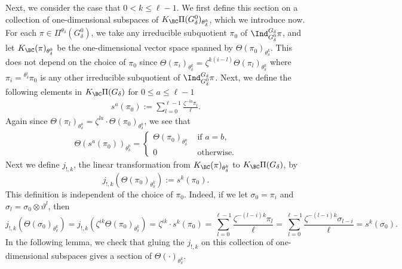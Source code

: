 \documentclass[11pt,letterpaper]{amsart}
\numberwithin{equation}{section}
\begin{document}
Next, we consider the case that $0 < k \leq \ell-1$. We first define this section on a collection of one-dimensional subspaces of $K_{\BC}\Pi(G^0_{\delta})_{\theta_\delta^k}$, which we introduce now. For each $\pi \in \Pi^{\theta_{\delta}}(G_{\delta}^0)$, we take any irreducible subquotient $\pi_0$ of $\Ind_{G^0_{\delta}}^{G_{\delta}} \pi$, and let $K_{\BC}(\pi)_{\theta_\delta^k}$ be the one-dimensional vector space spanned by $\Theta(\pi_0)_{\theta_\delta^k}$. This does not depend on the choice of $\pi_0$ since $\Theta(\pi_i)_{\theta_\delta^k}= \zeta^{k(i-l)}\Theta(\pi_l)_{\theta_\delta^k}$ where $\pi_i={}^{\theta_{\delta}^i}\pi_0$ is any other irreducible subquotient of $\Ind_{G^0_{\delta}}^{G_{\delta}} \pi$.  
Next, we define the following elements in $K_{\BC}\Pi(G_{\delta})$ for $0 \leq a \leq \ell-1$
\begin{align}\label{eq extension by zero}
    s^{a}(\pi_0) := \sum_{l=0}^{\ell -1} \frac{\zeta^{ -la } \pi_l}{\ell}.
\end{align}
Again since $ \Theta(\pi_l)_{\theta_\delta^{a}}= \zeta^{la}\cdot \Theta(\pi_0)_{\theta_\delta^{a}}$, we see that 
\begin{align}\label{eq twisted distribution section}
    \Theta( s^{a}(\pi_0))_{\theta_\delta^{b}}=\begin{cases}
        \Theta(\pi_0)_{\theta_\delta^{a}} & \text{ if }a=b,\\
        0 & \text{ otherwise.}
    \end{cases}
\end{align} 
Next we define $j_{!,k}$, the linear transformation from $K_{\BC}(\pi)_{\theta_\delta^k}$ to $K_{\BC}\Pi(G_{\delta})$,  by
\[ j_{!,k}( \Theta(\pi_0)_{\theta_\delta^k}):= s^k( \pi_0). \]
This definition is independent of the choice of $\pi_0$. Indeed, if we let $\sigma_0= \pi_i$ and $\sigma_l= \sigma_0 \otimes \vartheta^{l} $, then 
\[ j_{!,k}( \Theta(\sigma_0)_{\theta_\delta^k})= j_{!,k}( \zeta^{ik} \Theta(\pi_0)_{\theta_\delta^k})=\zeta^{ik} \cdot s^k(\pi_0)= \sum_{l=0}^{\ell -1}  \frac{\zeta^{-(l-i)k}\pi_l}{\ell}=\sum_{l=0}^{\ell -1}  \frac{\zeta^{-(l-i)k}\sigma_{l-i}}{\ell}= s^k(\sigma_0).  \]
 In the following lemma, we check that gluing the $j_{!,k}$ on this collection of one-dimensional subspaces gives a section of $\Theta(\cdot)_{\theta_{\delta}^k}$. 
\end{document}
